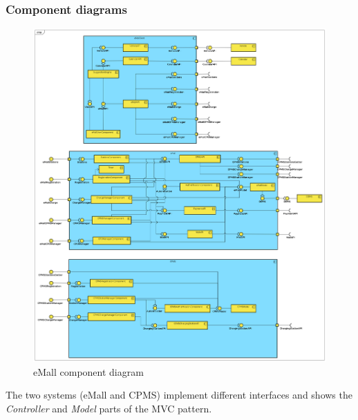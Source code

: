 \subsubsection{Component diagrams}
\begin{figure}[!h]
    \begin{center}
        \includegraphics[keepaspectratio, width=16cm]{Component/Component.png}
        \caption{eMall component diagram}
        \label{fig:eMSP-component}
    \end{center}
\end{figure}
\clearpage
The two systems (\ac{eMall} and \ac{CPMS}) implement different interfaces and shows the \textit{Controller} and \textit{Model} parts of the \ac{MVC} pattern.
\makeatletter
\let\orgdescriptionlabel\descriptionlabel
\renewcommand*{\descriptionlabel}[1]{%
    \let\orglabel\label
    \let\label\@gobble
    \phantomsection
    \edef\@currentlabel{#1\unskip}%
    \let\label\orglabel
    \orgdescriptionlabel{#1}%
}
\makeatother

